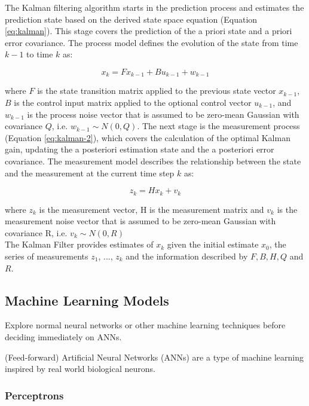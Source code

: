 \documentclass[12pt, a4paper]{article}
\begin{document}
The Kalman filtering algorithm starts in the prediction process and estimates the prediction state based on the derived state space equation (Equation \ref{eq:kalman}). This stage covers the prediction of the a priori state and a priori error covariance. The process model defines the evolution of the state from time $k-1$ to time $k$ as:

\begin{equation}
\label{eq:kalman}
    x_k = Fx_{k-1} + Bu_{k-1} + w_{k-1}
\end{equation}

where $F$ is the state transition matrix applied to the previous state vector $x_{k-1}$, $B$ is the control input matrix applied to the optional control vector $u_{k-1}$, and $w_{k-1}$ is the process noise vector that is assumed to be zero-mean Gaussian with covariance $Q$, i.e. $w_{k-1} \sim N(0, Q)$. The next stage is the measurement process (Equation \ref{eq:kalman-2}), which covers the calculation of the optimal Kalman gain, updating the a posteriori estimation state and the a posteriori error covariance. The measurement model describes the relationship between the state and the measurement at the current time step $k$ as:

\begin{equation}
\label{eq:kalman-2}
    z_k = Hx_k + v_k
\end{equation}

where $z_k$ is the measurement vector, H is the measurement matrix and $v_k$ is the measurement noise vector that is assumed to be zero-mean Gaussian with covariance R, i.e. $v_k \sim N(0, R)$ \\

The Kalman Filter provides estimates of $x_k$ given the initial estimate $x_0$, the series of measurements $z_1$, ..., $z_k$ and the information described by $F, B, H, Q$ and $R$. \\

\subsection{Machine Learning Models}
\label{ml-models}

Explore normal neural networks or other machine learning techniques before deciding immediately on ANNs.

(Feed-forward) Artificial Neural Networks (ANNs) are a type of machine learning inspired by real world biological neurons. 

\subsubsection{Perceptrons}
\end{document}
